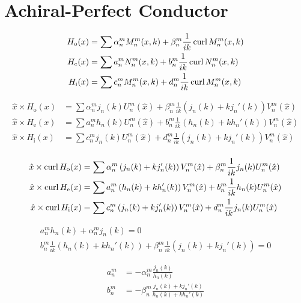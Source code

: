\section{Achiral-Perfect Conductor}

\begin{align*}
  H_{\text{o}}(x) &= \sum\alpha_n^m M_n^m(x, k) + \beta_n^m\frac{1}{ik}\operatorname{curl} M_n^m(x, k) \\
  H_{\text{e}}(x) &= \sum a_n^m N_n^m(x, k) + b_n^m\frac{1}{ik}\operatorname{curl} N_n^m(x, k) \\
  H_{\text{i}}(x) &= \sum c_n^m M_n^m(x, k) + d_n^m\frac{1}{ik}\operatorname{curl} M_n^m(x, k)
\end{align*}

\begin{align*}
  \hat{x}\times H_{\text{o}}(x) &= \sum\alpha_n^m j_n(k) U_n^m(\hat{x}) + \beta_n^m\frac{1}{ik} \left(j_n(k) + k j_n'(k)\right) V_n^m(\hat{x}) \\
  \hat{x}\times H_{\text{e}}(x) &= \sum a_n^m h_n(k) U_n^m(\hat{x}) + b_n^m\frac{1}{ik} \left(h_n(k) + k h_n'(k)\right) V_n^m(\hat{x}) \\
  \hat{x}\times H_{\text{i}}(x) &= \sum c_n^m j_n(k) U_n^m(\hat{x}) + d_n^m\frac{1}{ik} \left(j_n(k) + k j_n'(k)\right) V_n^m(\hat{x}) \\
\end{align*}

\begin{align*}
  \hat{x}\times \operatorname{curl} H_{\text{o}}(x) &= \sum\alpha_n^m\left(j_n(k) + k j_n'(k)\right) V_n^m(\hat{x}) + \beta_n^m\frac{1}{ik} j_n(k) U_n^m(\hat{x}) \\
  \hat{x}\times \operatorname{curl} H_{\text{e}}(x) &= \sum a_n^m\left(h_n(k) + k h_n'(k)\right) V_n^m(\hat{x}) + b_n^m\frac{1}{ik} h_n(k) U_n^m(\hat{x}) \\
  \hat{x}\times \operatorname{curl} H_{\text{i}}(x) &= \sum c_n^m\left(j_n(k) + k j_n'(k)\right) V_n^m(\hat{x}) + d_n^m\frac{1}{ik} j_n(k) U_n^m(\hat{x}) \\
\end{align*}

\begin{gather}
  a_n^m h_n(k) + \alpha_n^m j_n(k) = 0 \\
  b_n^m \frac{1}{ik}\left(h_n(k) + k h_n'(k)\right) + \beta_n^m\frac{1}{ik}\left(j_n(k) + k j_n'(k)\right) = 0 
\end{gather}

\begin{align*}
  a_n^m &= - \alpha_n^m \frac{j_n(k)}{h_n(k)} \\
  b_n^m &= - \beta_n^m \frac{j_n(k) + k j_n'(k)}{h_n(k) + k h_n'(k)} \\
\end{align*}

